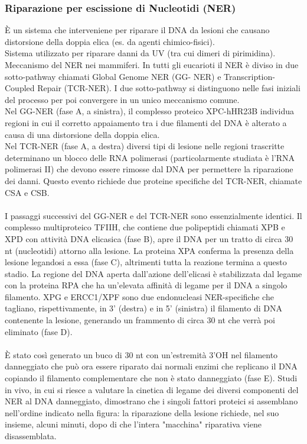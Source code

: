 \documentclass{article}
\begin{document}
\subsubsection{Riparazione per escissione di Nucleotidi (NER)}
È un sistema che interveniene per riparare il DNA da lesioni che causano distorsione della doppia elica (es. da agenti
chimico-fisici).\\
Sistema utilizzato per riparare danni da UV (tra cui dimeri di pirimidina).\\
Meccanismo del NER nei mammiferi. In tutti gli eucarioti il NER è diviso in due sotto-pathway chiamati Global Genome NER (GG- NER) e Transcription-Coupled Repair (TCR-NER).
I due sotto-pathway si distinguono nelle fasi iniziali del processo per poi convergere in un unico meccanismo comune.\\
Nel GG-NER (fase A, a sinistra), il complesso proteico XPC-hHR23B individua regioni in cui il corretto appaiamento tra i
due filamenti del DNA è alterato a causa di una distorsione della doppia elica.\\
Nel TCR-NER (fase A, a destra) diversi tipi di lesione nelle regioni trascritte determinano un blocco delle RNA polimerasi
(particolarmente studiata è l'RNA polimerasi II) che devono essere rimosse dal DNA per permettere la riparazione dei danni. Questo evento richiede due proteine specifiche del TCR-NER, chiamate CSA e CSB.\\
\paragraph{}I passaggi successivi del GG-NER e del TCR-NER sono
essenzialmente identici.
Il complesso multiproteico TFIIH, che contiene due polipeptidi chiamati XPB e XPD con attività DNA elicasica (fase B), apre il DNA per un tratto di circa 30 nt (nucleotidi) attorno alla lesione.
La proteina XPA conferma la presenza della lesione legandosi a
essa (fase C), altrimenti tutta la reazione termina a questo stadio. La regione del DNA aperta dall'azione dell'elicasi è
stabilizzata dal legame con la proteina RPA che ha un'elevata affinità di legame per il DNA a singolo filamento.
XPG e ERCC1/XPF sono due endonucleasi NER-specifiche che tagliano, rispettivamente, in 3' (destra) e in 5' (sinistra) il filamento di DNA contenente la lesione, generando un frammento di circa 30 nt che verrà poi eliminato (fase D).
\paragraph{}È stato così generato un buco di 30 nt con un'estremità 3'OH nel
filamento danneggiato che può ora essere riparato dai normali
enzimi che replicano il DNA copiando il filamento complementare
che non è stato danneggiato (fase E). Studi in vivo, in cui si riesce a valutare la cinetica di legame dei diversi componenti del NER al
DNA danneggiato, dimostrano che i singoli fattori proteici si assemblano nell'ordine indicato nella figura: la riparazione della
lesione richiede, nel suo insieme, alcuni minuti, dopo di che l'intera "macchina" riparativa viene disassemblata.
\end{document}
